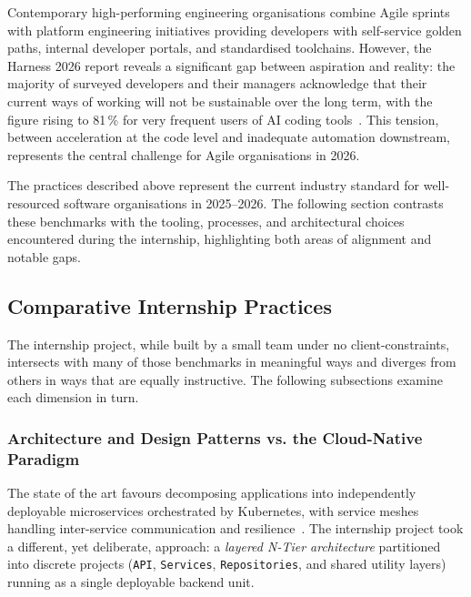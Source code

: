 Contemporary high-performing engineering organisations combine Agile
sprints with platform engineering initiatives providing developers
with self-service golden paths, internal developer portals, and
standardised toolchains.
However, the Harness 2026 report reveals a significant gap between
aspiration and reality: the majority of surveyed developers and their
managers acknowledge that their current ways of working will not be
sustainable over the long term, with the figure rising to 81\,\% for
very frequent users of AI coding tools~\cite{harness2026devops}.
This tension, between acceleration at the code level and inadequate
automation downstream, represents the central challenge for Agile
organisations in 2026.
 
\bigskip
\noindent
The practices described above represent the current industry standard
for well-resourced software organisations in 2025--2026. The
following section contrasts these benchmarks with the tooling,
processes, and architectural choices encountered during the
internship, highlighting both areas of alignment and notable gaps.
 
 
\vspace*{0.5cm}
\subsection{Comparative Internship Practices}\label{sub:contrast}
 
The internship project, while built by a small team under no
client-constraints, intersects with many of those benchmarks in
meaningful ways and diverges from others in ways that are equally
instructive.
The following subsections examine each dimension in turn.
 
 
\subsubsection{Architecture and Design Patterns vs. the Cloud-Native
Paradigm}\label{subsub:contrast:arch}
 
The state of the art favours decomposing applications into
independently deployable microservices orchestrated by Kubernetes,
with service meshes handling inter-service communication and
resilience~\cite{ini8labs2025,madrigan2025}.
The internship project took a different, yet deliberate, approach:
a \textit{layered N-Tier architecture} partitioned into discrete
projects (\texttt{API}, \texttt{Services}, \texttt{Repositories},
and shared utility layers) running as a single deployable backend
unit.
 

